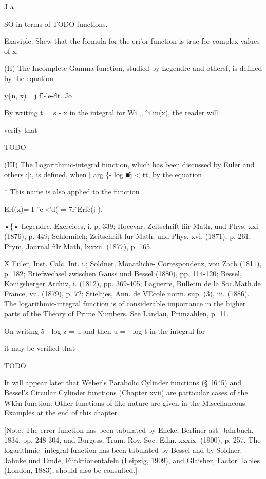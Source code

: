 J a

SO in terms of TODO functions.

Exaviple. Shew that the formula for the eri'or function is true for
complex values of x.

(II) The Incomplete Gamma function, studied by Legendre and othersf,
is defined by the equation

y\{n, x)= j f'-'e-\^dt. Jo

By writing t = s - x in the integral for Wi.,,\^\_i in(x), the reader
will

verify that

TODO

(III) The Logarithmic-integral function, which has been discussed by
Euler and others :|:, is defined, when | arg \{- log \^■j < tt, by the
equation

* This name is also applied to the function

Erf(x)= I ''e-«'d( = 7r\^-Erfc(j-).

•\{• Legendre, Exercices, i. p. 339; Hocevar, Zeitschrift fiir Math,
und Phys. xxi. (1876), p. 449; Schlomilch; Zeitschrift fur Math, und
Phys. xvi. (1871), p. 261; Prym, Journal filr Math, lxxxii. (1877),
p. 165.

X Euler, Inst. Calc. Int. i.; Soldner, Monatliche- Correspondenz, von
Zach (1811), p. 182; Briefwechsel zwischen Gauss und Bessel (1880),
pp. 114-120; Bessel, Konigsherger Archiv, i. (1812), pp. 369-405;
Laguerre, Bulletin de la Soc.Math.de France, vii. (1879), p. 72;
Stieltjes, Ann. de VEcole norm. sup. (3), iii. (1886). The
logarithmic-integral function is of considerable importance in the
higher parts of the Theory of Prime Numbers. See Landau, Primzahlen,
p. 11.

%
%

On writing 5 - log z = u and then u = - log t in the integral for

it may be verified that

TODO

It will appear later that Weber's Parabolic Cylinder functions (§
16*5) and Bessel's Circular Cylinder functions (Chapter xvii) are
particular cases of the Wk\^rn function. Other functions of like
nature are given in the Miscellaneous Examples at the end of this
chapter.

[Note. The error function has been tabulated by Encke, Berliner ast.
Jahrbuch, 1834, pp. 248-304, and Burgess, Tram. Roy. Soc. Edin. xxxix.
(1900), p. 257. The logarithmic- integral function has been tabulated
by Bessel and by Soldner. Jahnke und Emde, Fiinktionentafeln (Leipzig,
1909), and Glaisher, Factor Tables (London, 1883), should also be
consulted.]


